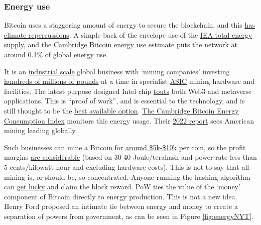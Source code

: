\subsubsection{Energy use}
Bitcoin uses a staggering amount of energy to secure the blockchain, and this \href{https://www.edmundconway.com/bitcoin-money-and-the-planet/}{has climate repercussions}. A simple back of the envelope use of the \href{https://www.iea.org/reports/key-world-energy-statistics-2021/supply}{IEA total energy supply}, and the \href{https://ccaf.io/cbeci/index}{Cambridge Bitcoin energy use} estimate puts the network at \href{https://www.wolframalpha.com/input?i=153+terawatt+hours+as+percentage+of+\%28600+exa+joules+as+terrawatt+hours\%29+}{around 0.1\%} of global energy use.\par
It is an \href{https://www.ruetir.com/2022/03/18/riot-whinstone-the-bitcoin-farm-with-100000-computers-that-uses-excess-energy-from-an-oil-platform-to-mine-cryptocurrencies-ruetir/}{industrial scale} global business with `mining companies' investing \href{https://ir.marathondh.com/news-events/press-releases/detail/1272/marathon-digital-holdings-bitcoin-mining-fleet-to-reach}{hundreds of millions of pounds} at a time in specialist \href{https://en.wikipedia.org/wiki/Application-specific_integrated_circuit}{ASIC} mining hardware and facilities. The latest purpose designed Intel chip \href{https://www.intel.com/content/www/us/en/newsroom/opinion/thoughts-blockchain-custom-compute-group.html#gs.pd9ofu}{touts} both Web3 and metaverse applications. This is ``proof of work'',  and is essential to the technology, and is still thought to be the \href{https://www.truthcoin.info/blog/pow-cheapest/}{best available option}. \href{https://ccaf.io/cbeci/index}{The Cambridge Bitcoin Energy Consumption Index} monitors this energy usage. Their \href{https://www.jbs.cam.ac.uk/insight/2022/bitcoin-mining-new-data-reveal-a-surprising-resurgence/}{2022 report} sees American mining leading globally.\par
Such businesses can mine a Bitcoin for \href{https://cointelegraph.com/news/marathon-digital-keeps-on-mining-despite-btc-price-slump}{around \$5k-\$10k} per coin, so the profit margins \href{https://www.nicehash.com/profitability-calculator}{are considerable} (based on 30-40 Joule/terahash and power rate less than 5 cents/kilowatt hour and excluding hardware costs). This is not to say that all mining is, or should be, so concentrated. Anyone running the hashing algorithm can \href{https://twitter.com/ckpooldev/status/1485585814419812356}{get lucky} and claim the block reward. PoW ties the value of the `money' component of Bitcoin directly to energy production. This is not a new idea. Henry Ford proposed an intimate tie between energy and money to create a separation of powers from government, as can be seen in Figure \ref{fig:energyNYT}.\
